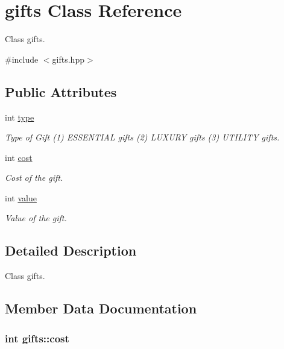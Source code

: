 \hypertarget{classgifts}{\section{gifts Class Reference}
\label{classgifts}
}


Class gifts.  




{\ttfamily \#include $<$gifts.\-hpp$>$}

\subsection*{Public Attributes}
\begin{DoxyCompactItemize}
\item 
int \hyperlink{classgifts_acc6b677b2abb3dc88a65e33ce866ba09}{type}
\begin{DoxyCompactList}\small\item\em Type of Gift (1) E\-S\-S\-E\-N\-T\-I\-A\-L gifts (2) L\-U\-X\-U\-R\-Y gifts (3) U\-T\-I\-L\-I\-T\-Y gifts. \end{DoxyCompactList}\item 
int \hyperlink{classgifts_a41d729519204ab6f8fe3e29e7a05bd5d}{cost}
\begin{DoxyCompactList}\small\item\em Cost of the gift. \end{DoxyCompactList}\item 
int \hyperlink{classgifts_a5cec737320153911ac8c721907ace3e2}{value}
\begin{DoxyCompactList}\small\item\em Value of the gift. \end{DoxyCompactList}\end{DoxyCompactItemize}


\subsection{Detailed Description}
Class gifts. 

\subsection{Member Data Documentation}
\hypertarget{classgifts_a41d729519204ab6f8fe3e29e7a05bd5d}{
\subsubsection[{cost}]{\setlength{\rightskip}{0pt plus 5cm}int gifts\-::cost}}\label{classgifts_a41d729519204ab6f8fe3e29e7a05bd5d}


